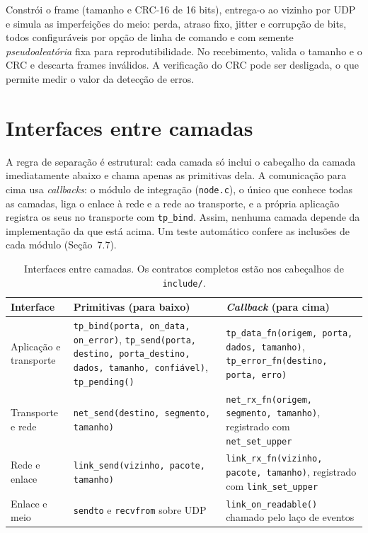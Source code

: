 \documentclass[11pt,a4paper]{article}
\begin{document}
Constr\'oi o frame (tamanho e CRC-16 de 16 bits), entrega-o ao vizinho por UDP e simula as imperfei\c{c}\~oes do meio: perda, atraso fixo, jitter e corrup\c{c}\~ao de bits, todos configur\'aveis por op\c{c}\~ao de linha de comando e com semente \emph{pseudoaleat\'oria} fixa para reprodutibilidade. No recebimento, valida o tamanho e o CRC e descarta frames inv\'alidos. A verifica\c{c}\~ao do CRC pode ser desligada, o que permite medir o valor da detec\c{c}\~ao de erros.

\section{Interfaces entre camadas}

A regra de separa\c{c}\~ao \'e estrutural: cada camada s\'o inclui o cabe\c{c}alho da camada imediatamente abaixo e chama apenas as primitivas dela. A comunica\c{c}\~ao para cima usa \emph{callbacks}: o m\'odulo de integra\c{c}\~ao (\texttt{node.c}), o \'unico que conhece todas as camadas, liga o enlace \`a rede e a rede ao transporte, e a pr\'opria aplica\c{c}\~ao registra os seus no transporte com \texttt{tp\_bind}. Assim, nenhuma camada depende da implementa\c{c}\~ao da que est\'a acima. Um teste autom\'atico confere as inclus\~oes de cada m\'odulo (Se\c{c}\~ao~7.7).

\begin{table}[H]
\centering\small
\begin{tabular}{L{2.6cm}L{6.2cm}L{5.0cm}}
\toprule
\textbf{Interface} & \textbf{Primitivas (para baixo)} & \textbf{\emph{Callback} (para cima)} \\
\midrule
Aplica\c{c}\~ao e transporte & \texttt{tp\_bind(porta, on\_data, on\_error)}, \texttt{tp\_send(porta, destino, porta\_destino, dados, tamanho, confi\'avel)}, \texttt{tp\_pending()} & \texttt{tp\_data\_fn(origem, porta, dados, tamanho)}, \texttt{tp\_error\_fn(destino, porta, erro)} \\
Transporte e rede & \texttt{net\_send(destino, segmento, tamanho)} & \texttt{net\_rx\_fn(origem, segmento, tamanho)}, registrado com \texttt{net\_set\_upper} \\
Rede e enlace & \texttt{link\_send(vizinho, pacote, tamanho)} & \texttt{link\_rx\_fn(vizinho, pacote, tamanho)}, registrado com \texttt{link\_set\_upper} \\
Enlace e meio & \texttt{sendto} e \texttt{recvfrom} sobre UDP & \texttt{link\_on\_readable()} chamado pelo la\c{c}o de eventos \\
\bottomrule
\end{tabular}
\caption{Interfaces entre camadas. Os contratos completos est\~ao nos cabe\c{c}alhos de \texttt{include/}.}
\end{table}
\end{document}
